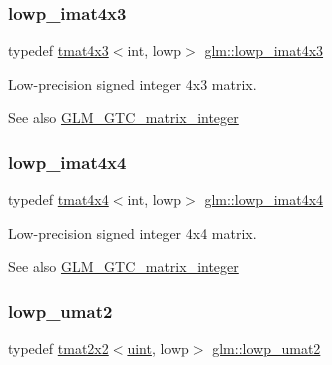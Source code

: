 \subsubsection{\texorpdfstring{lowp\+\_\+imat4x3}{lowp\_imat4x3}}
{\footnotesize\ttfamily typedef \hyperlink{structglm_1_1tmat4x3}{tmat4x3}$<$int, lowp$>$ \hyperlink{group__gtc__matrix__integer_ga76c201715b216ddd5d7de3c3759211f1}{glm\+::lowp\+\_\+imat4x3}}

Low-\/precision signed integer 4x3 matrix. \begin{DoxySeeAlso}{See also}
\hyperlink{group__gtc__matrix__integer}{G\+L\+M\+\_\+\+G\+T\+C\+\_\+matrix\+\_\+integer} 
\end{DoxySeeAlso}
\mbox{\label{group__gtc__matrix__integer_ga46f8dc46c3dcde8fa2e8b8f645c0d9ef}} 
\subsubsection{\texorpdfstring{lowp\+\_\+imat4x4}{lowp\_imat4x4}}
{\footnotesize\ttfamily typedef \hyperlink{structglm_1_1tmat4x4}{tmat4x4}$<$int, lowp$>$ \hyperlink{group__gtc__matrix__integer_ga46f8dc46c3dcde8fa2e8b8f645c0d9ef}{glm\+::lowp\+\_\+imat4x4}}

Low-\/precision signed integer 4x4 matrix. \begin{DoxySeeAlso}{See also}
\hyperlink{group__gtc__matrix__integer}{G\+L\+M\+\_\+\+G\+T\+C\+\_\+matrix\+\_\+integer} 
\end{DoxySeeAlso}
\mbox{\label{group__gtc__matrix__integer_ga0ff71fefa5bfab1462195c3de4f83f67}} 
\subsubsection{\texorpdfstring{lowp\+\_\+umat2}{lowp\_umat2}}
{\footnotesize\ttfamily typedef \hyperlink{structglm_1_1tmat2x2}{tmat2x2}$<$\hyperlink{group__core__precision_ga4fd29415871152bfb5abd588334147c8}{uint}, lowp$>$ \hyperlink{group__gtc__matrix__integer_ga0ff71fefa5bfab1462195c3de4f83f67}{glm\+::lowp\+\_\+umat2}}

